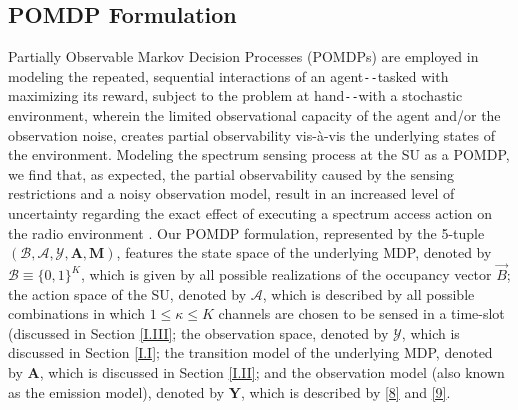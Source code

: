 \subsection{POMDP Formulation}\label{I.IV}
Partially Observable Markov Decision Processes (POMDPs) are employed in modeling the repeated, sequential interactions of an agent\texttt{-{}-}tasked with maximizing its reward, subject to the problem at hand\texttt{-{}-}with a stochastic environment, wherein the limited observational capacity of the agent and/or the observation noise, creates partial observability vis-\`{a}-vis the underlying states of the environment. Modeling the spectrum sensing process at the SU as a POMDP, we find that, as expected, the partial observability caused by the sensing restrictions and a noisy observation model, result in an increased level of uncertainty regarding the exact effect of executing a spectrum access action on the radio environment \cite{WCL:paper}. Our POMDP formulation, represented by the 5-tuple $(\mathcal{B},\mathcal{A},\mathcal{Y},\mathbf{A},\mathbf{M})$, features the state space of the underlying MDP, denoted by $\mathcal{B}{\equiv}\{0,1\}^{K}$, which is given by all possible realizations of the occupancy vector $\vec{B}$; the action space of the SU, denoted by $\mathcal{A}$, which is described by all possible combinations in which $1{\leq}\kappa{\leq}K$ channels are chosen to be sensed in a time-slot (discussed in Section \ref{I.III}; the observation space, denoted by $\mathcal{Y}$, which is discussed in Section \ref{I.I}; the transition model of the underlying MDP, denoted by $\mathbf{A}$, which is discussed in Section \ref{I.II}; and the observation model (also known as the emission model), denoted by $\mathbf{Y}$, which is described by \eqref{8} and \eqref{9}.

